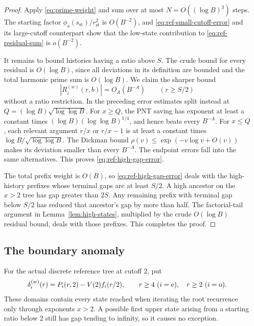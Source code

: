 \begin{proof}
Apply \eqref{eq:prime-weight} and sum over at most
$N=O((\log B)^3)$ steps.  The starting factor
$\phi_\ee(s_{\mathrm{st}})/r_{\mathrm{st}}^2$ is $O(B^{-2})$, and
\eqref{eq:ref-small-cutoff-error} and its large-cutoff counterpart show
that the low-state contribution to \eqref{eq:ref-residual-sum} is
$o(B^{-2})$.

It remains to bound histories having a ratio above $S$.  The crude
bound for every residual is $O(\log B)$, since all deviations in its
definition are bounded and the total harmonic prime sum is
$O(\log B)$.  We claim the sharper bound
\begin{equation}\label{eq:ref-high-gap-error}
 |R_i^{(w)}(r,b)|=O_A(B^{-A})\qquad(r\geq S/2)
\end{equation}
without a ratio restriction.  In the preceding error estimates split
instead at
$Q=(\log B)\sqrt{\log\log B}$.  For $x\geq Q$, the PNT saving has
exponent at least a constant times
$(\log B)(\log\log B)^{1/4}$, and hence beats every $B^{-A}$.  For
$x\leq Q$, each relevant argument $r/x$ or $r/x-1$ is at least a
constant times $\log B/\sqrt{\log\log B}$.  The Dickman bound
$\rho(v)\leq\exp(-v\log v+O(v))$ makes its deviation smaller than every
$B^{-A}$.  The endpoint errors fall into the same alternatives.
This proves \eqref{eq:ref-high-gap-error}.

The total prefix weight is $O(B)$, so
\eqref{eq:ref-high-gap-error} deals with the high-history prefixes
whose terminal gaps are at least $S/2$.  A high ancestor on the
$x>2$ tree has gap greater than $2S$.  Any remaining prefix with
terminal gap below $S/2$ has reduced that ancestor's gap by more than
half.  The factorial-tail argument in Lemma~\ref{lem:high-states},
multiplied by the crude $O(\log B)$ residual bound, deals with those
prefixes.  This completes the proof.
\end{proof}

\subsection{The boundary anomaly}

For the actual discrete reference tree at cutoff $2$, put
\begin{equation}\label{eq:ref-anomaly}
 \delta_i^{(w)}(r)=P_i(r,2)-V(2)f_i(r/2),
 \qquad r\geq4\ (i=\mathrm e),\quad r\geq2\ (i=\mathrm o).
\end{equation}
These domains contain every state reached when iterating the root
recurrence only through exponents $x>2$.  A possible first upper state
arising from a starting ratio below $2$ still has gap tending to
infinity, so it causes no exception.

